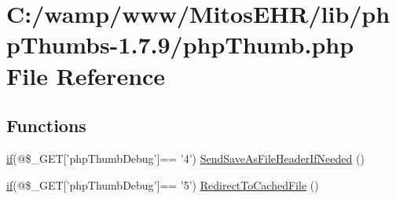\hypertarget{php_thumb_8php}{\section{\-C\-:/wamp/www/\-Mitos\-E\-H\-R/lib/php\-Thumbs-\/1.7.9/php\-Thumb.php \-File \-Reference}
\label{php_thumb_8php}
}
\subsection*{\-Functions}
\begin{DoxyCompactItemize}
\item 
\hyperlink{_setup_8inc_8php_ad0184337b31d13763ec8751feff4aabe}{if}(@\$\-\_\-\-G\-E\-T\mbox{[}'php\-Thumb\-Debug'\mbox{]}== '4') \hyperlink{php_thumb_8php_ade129c0247821a212c504c942b8b276f}{\-Send\-Save\-As\-File\-Header\-If\-Needed} ()
\item 
\hyperlink{_setup_8inc_8php_ad0184337b31d13763ec8751feff4aabe}{if}(@\$\-\_\-\-G\-E\-T\mbox{[}'php\-Thumb\-Debug'\mbox{]}== '5') \hyperlink{php_thumb_8php_a1046a0a26a07aea6db565bc651ec6e51}{\-Redirect\-To\-Cached\-File} ()
\end{DoxyCompactItemize}
